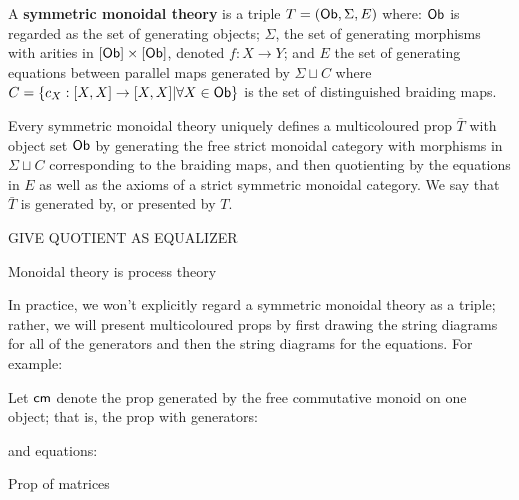 \begin{definition}
\label{def:monoidaltheory}


A {\bf symmetric monoidal theory} is a triple $T=({\sf Ob},\Sigma ,E )$ where: ${\sf Ob}$ is regarded as the set of generating objects; $\Sigma$, the set of generating morphisms with arities in $[{\sf Ob}]\times [{\sf Ob}]$, denoted $f:X\to Y$;  and $E$ the set of generating equations between parallel maps generated by $\Sigma \sqcup C$  where $C=\{c_X:[X,X]\to [X,X]|\forall X \in {\sf Ob}\}$ is the set of distinguished braiding maps.

Every symmetric monoidal theory uniquely defines a multicoloured prop $\bar T$ with object set $\sf Ob$ by generating the free strict monoidal category with morphisms in $\Sigma\sqcup C$   corresponding to the braiding maps, and then quotienting by the equations in $E$ as well as the axioms of a strict symmetric  monoidal category.  We say that $\bar T$ is generated by, or presented by $T$.

GIVE QUOTIENT AS EQUALIZER
\end{definition}

Monoidal theory is process theory

In practice, we won't explicitly regard a symmetric monoidal theory as a triple; rather, we will present multicoloured props by first drawing the string diagrams for all of the generators and then the string diagrams for the equations. For example:




\begin{example}
Let ${\sf cm}$ denote the prop generated by the free commutative monoid on one object; that is, the prop with generators:


and equations:



\end{example}


\begin{example}
Prop of matrices
\end{example}


